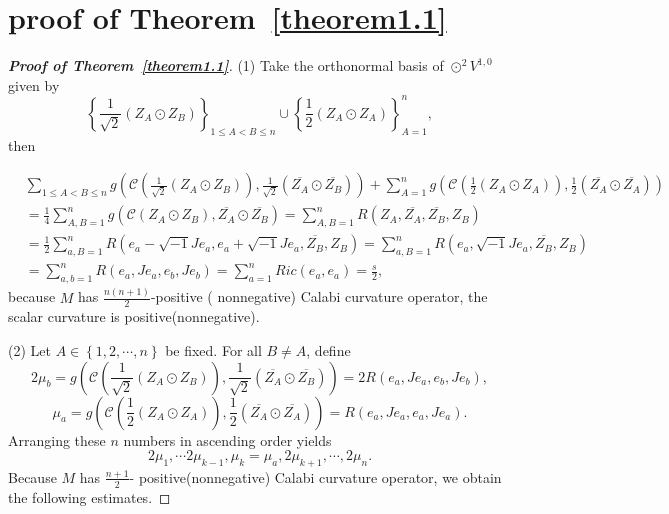 \documentclass{amsart}
\theoremstyle{definition}
\theoremstyle{remark}
\numberwithin{equation}{section}
\begin{document}
\section{proof of Theorem~\ref{theorem1.1}}
\begin{proof}[{\bf Proof of Theorem~\ref{theorem1.1}}]
(1) Take the orthonormal basis of ${ \odot ^2}{V^{1,0}}$ given by $${\left\{ {\frac{1}{{\sqrt 2 }}\left( {{Z_A} \odot {Z_B}} \right)} \right\}_{1 \le A < B \le n}} \cup \left\{ {\frac{1}{2}\left( {{Z_A} \odot {Z_A}} \right)} \right\}_{A = 1}^n,$$ then

\begin{align*}
  &\sum\limits_{1 \le A < B \le n}^{} {g\left( {\mathcal{C} \left( {\frac{1}{{\sqrt 2 }}\left( {{Z_A} \odot {Z_B}} \right)} \right),\frac{1}{{\sqrt 2 }}\left( {\overline {{Z_A}}  \odot \overline {{Z_B}} } \right)} \right)}  + \sum\limits_{A = 1}^n {g\left( {\mathcal{C}\left( {\frac{1}{2}\left( {{Z_A} \odot {Z_A}} \right)} \right),\frac{1}{2}\left( {\overline {{Z_A}}  \odot \overline {{Z_A}} } \right)} \right)}  \\
  &= \frac{1}{4}\sum\limits_{A,B = 1}^n {g\left( {\mathcal{C}\left( {{Z_A} \odot {Z_B}} \right),\overline {{Z_A}}  \odot \overline {{Z_B}} } \right)}  =\sum\limits_{A,B = 1}^n {R\left( {{Z_A},\overline {{Z_A}} ,\overline {{Z_B}} ,{Z_B}} \right)}\\
   &=\frac{1}{2}\sum\limits_{a,B = 1}^n {R\left( {{e_a} - \sqrt { - 1} J{e_a},{e_a} + \sqrt { - 1} J{e_a},\overline {{Z_B}} ,{Z_B}} \right)}
   = \sum\limits_{a,B = 1}^n {R\left( {{e_a},\sqrt { - 1} J{e_a},\overline {{Z_B}} ,{Z_B}} \right)} \\
   &= \sum\limits_{a,b = 1}^n {R\left( {{e_a},J{e_a},{e_b},J{e_b}} \right)}
   = \sum\limits_{a = 1}^n {Ric\left( {{e_a},{e_a}} \right)}
   =\frac{s}{2} ,
\end{align*}
because $M$ has $\frac{{n\left( {n + 1} \right)}}{2}$-positive ( nonnegative) Calabi curvature operator,  the scalar curvature is positive(nonnegative).

(2) Let $A \in \left\{ {1,2, \cdots ,n} \right\}$ be fixed. For all $B \ne A$, define
$$2{\mu _b}=g\left( {\mathcal{C}\left( {\frac{1}{{\sqrt 2 }}\left( {{Z_A} \odot {Z_B}} \right)} \right),\frac{1}{{\sqrt 2 }}\left( {\overline {{Z_A}}  \odot \overline {{Z_B}} } \right)} \right) = 2R\left( {{e_a},J{e_a},{e_b},J{e_b}} \right),$$
$${\mu _a}=g\left( {\mathcal{C}\left( {\frac{1}{2}\left( {{Z_A} \odot {Z_A}} \right)} \right),\frac{1}{2}\left( {\overline {{Z_A}}  \odot \overline {{Z_A}} } \right)} \right) = R\left( {{e_a},J{e_a},{e_a},J{e_a}} \right).$$
Arranging these $n$ numbers in ascending order yields
$$2{\mu _1}, \cdots 2{\mu _{k - 1}},{\mu _k} = {\mu _a},2{\mu _{k + 1}}, \cdots, 2{\mu _n}.$$
Because $M$ has $\frac{n+1}{2}$- positive(nonnegative) Calabi curvature operator, we obtain the following estimates.


\end{proof}
\end{document}
